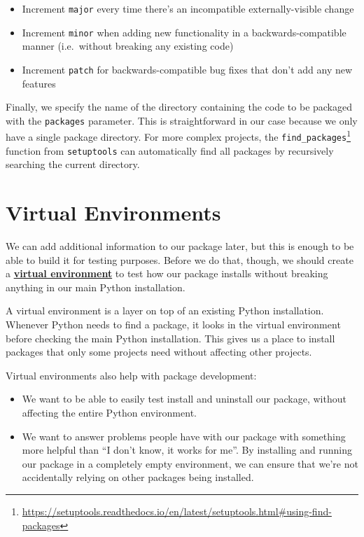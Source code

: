 \documentclass[
]{krantz}
\providecommand{\tightlist}{%
  \setlength{\itemsep}{0pt}\setlength{\parskip}{0pt}}
\renewcommand{\href}[2]{#2\footnote{\url{#1}}}
\newcommand{\gref}[2]{\hyperlink{#2}{\textbf{#1}}}
\begin{document}
\begin{itemize}
\tightlist
\item
  Increment \texttt{major} every time there's an incompatible externally-visible change
\item
  Increment \texttt{minor} when adding new functionality in a backwards-compatible manner
  (i.e.~without breaking any existing code)
\item
  Increment \texttt{patch} for backwards-compatible bug fixes that don't add any new features
\end{itemize}

Finally,
we specify the name of the directory
containing the code to be packaged with the \texttt{packages} parameter.
This is straightforward in our case because we only have a single package directory.
For more complex projects,
the \href{https://setuptools.readthedocs.io/en/latest/setuptools.html\#using-find-packages}{\texttt{find\_packages}} function from \texttt{setuptools}
can automatically find all packages by recursively searching the current directory.

\hypertarget{packaging-virtualenv}{%
\section{Virtual Environments}\label{packaging-virtualenv}}

We can add additional information to our package later,
but this is enough to be able to build it for testing purposes.
Before we do that,
though,
we should create a \gref{virtual environment}{virtual\_environment}
to test how our package installs
without breaking anything in our main Python installation.

A virtual environment is a layer on top of an existing Python installation.
Whenever Python needs to find a package,
it looks in the virtual environment before checking the main Python installation.
This gives us a place to install packages that only some projects need
without affecting other projects.

Virtual environments also help with package development:

\begin{itemize}
\tightlist
\item
  We want to be able to easily test install and uninstall our package,
  without affecting the entire Python environment.
\item
  We want to answer problems people have with our package with something more helpful than
  ``I don't know, it works for me''.
  By installing and running our package in a completely empty environment,
  we can ensure that we're not accidentally relying on other packages being installed.
\end{itemize}
\end{document}
